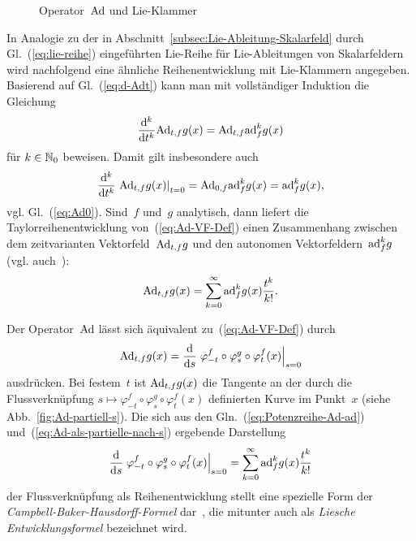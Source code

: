 \begin{figure}
\begin{centering}

\par\end{centering}
\caption{Operator~${\operatorname{Ad}}$ und Lie-Klammer\label{fig:Operator-Ad-und-Lie-Klammer}}
\end{figure}

In Analogie zu der in Abschnitt~\ref{subsec:Lie-Ableitung-Skalarfeld}
durch Gl.~(\ref{eq:lie-reihe}) eingeführten Lie-Reihe für Lie-Ableitungen
von Skalarfeldern wird nachfolgend eine ähnliche Reihenentwicklung
mit Lie-Klammern angegeben. Basierend auf Gl.~(\ref{eq:d-Adt}) kann
man mit vollständiger Induktion die Gleichung 
\[
\frac{{\mathrm{d}}^{k}}{{\mathrm{d}} t^{k}}{\operatorname{Ad}}_{t,f}g(x)={\operatorname{Ad}}_{t,f}{\operatorname{ad}}_{f}^{k}g(x)
\]
für $k\in{\mathbb{N}_0}$ beweisen. Damit gilt insbesondere auch 
\[
\frac{{\mathrm{d}}^{k}}{{\mathrm{d}} t^{k}}\left.{\operatorname{Ad}}_{t,f}g(x)\right|_{t=0}={\operatorname{Ad}}_{0,f}{\operatorname{ad}}_{f}^{k}g(x)={\operatorname{ad}}_{f}^{k}g(x),
\]
vgl. Gl.~(\ref{eq:Ad0}). Sind~$f$ und~$g$ analytisch, dann liefert
die Taylorreihenentwicklung von~(\ref{eq:Ad-VF-Def}) einen Zusammenhang
zwischen dem zeitvarianten Vektorfeld~${\operatorname{Ad}}_{t,f}g$ und den autonomen
Vektorfeldern~${\operatorname{ad}}_{f}^{k}g$ (vgl. auch~\cite{krener85}): 
\begin{equation}
{\operatorname{Ad}}_{t,f}g(x)=\sum_{k=0}^{\infty}{\operatorname{ad}}_{f}^{k}g(x)\frac{t^{k}}{k!}.\label{eq:Potenzreihe-Ad-ad}
\end{equation}

Der Operator~${\operatorname{Ad}}$ lässt sich äquivalent zu~(\ref{eq:Ad-VF-Def})
durch 
\begin{equation}
{\operatorname{Ad}}_{t,f}g(x)=\frac{{\mathrm{d}}}{{\mathrm{d}} s}\left.\varphi_{-t}^{f}\circ\varphi_{s}^{g}\circ\varphi_{t}^{f}(x)\right|_{s=0}\label{eq:Ad-als-partielle-nach-s}
\end{equation}
ausdrücken. Bei festem~$t$ ist ${\operatorname{Ad}}_{t,f}g(x)$ die Tangente an
der durch die Flussverknüpfung $s\mapsto\varphi_{-t}^{f}\circ\varphi_{s}^{g}\circ\varphi_{t}^{f}(x)$
definierten Kurve im Punkt~$x$ (siehe Abb.~\ref{fig:Ad-partiell-s}).
Die sich aus den Gln.~(\ref{eq:Potenzreihe-Ad-ad}) und~(\ref{eq:Ad-als-partielle-nach-s})
ergebende Darstellung 
\begin{equation}
\frac{{\mathrm{d}}}{{\mathrm{d}} s}\left.\varphi_{-t}^{f}\circ\varphi_{s}^{g}\circ\varphi_{t}^{f}(x)\right|_{s=0}=\sum_{k=0}^{\infty}{\operatorname{ad}}_{f}^{k}g(x)\frac{t^{k}}{k!}\label{eq:Campbell-Baker-Hausdorff-Formel}
\end{equation}
der Flussverknüpfung als Reihenentwicklung stellt eine spezielle Form
der \emph{Campbell-Baker-Hausdorff-Formel}
dar~\cite[S.~500]{isidori3}, die mitunter auch als \emph{Liesche
Entwicklungsformel} bezeichnet wird.

